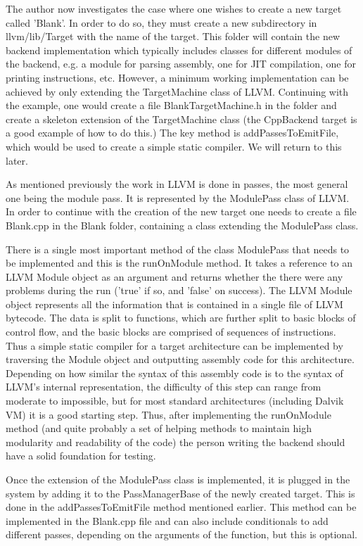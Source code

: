 \documentclass[parskip]{cs4rep}
\begin{document}
The author now investigates the case where one wishes to create a new target called 'Blank'. In order to do so, they must create a new subdirectory in llvm/lib/Target with the name of the target. This folder will contain the new backend implementation which typically includes classes for different modules of the backend, e.g. a module for parsing assembly, one for JIT compilation, one for printing instructions, etc. However, a minimum working implementation can be achieved by only extending the TargetMachine class of LLVM. Continuing with the example, one would create a file BlankTargetMachine.h in the folder and create a skeleton extension of the TargetMachine class (the CppBackend target is a good example of how to do this.) The key method is addPassesToEmitFile, which would be used to create a simple static compiler. We will return to this later.

As mentioned previously the work in LLVM is done in passes, the most general one being the module pass. It is represented by the ModulePass class of LLVM. In order to continue with the creation of the new target one needs to create a file Blank.cpp in the Blank folder, containing a class extending the ModulePass class.

There is a single most important method of the class ModulePass that needs to be implemented and this is the runOnModule method. It takes a reference to an LLVM Module object as an argument and returns whether the there were any problems during the run ('true' if so, and 'false' on success). The LLVM Module object represents all the information that is contained in a single file of LLVM bytecode. The data is split to functions, which are further split to basic blocks of control flow, and the basic blocks are comprised of sequences of instructions. Thus a simple static compiler for a target architecture  can be implemented by traversing the Module object and outputting assembly code for this architecture. Depending on how similar the syntax of this assembly code is to the syntax of LLVM's internal representation, the difficulty of this step can range from moderate to impossible, but for most standard architectures (including Dalvik VM) it is a good starting step. Thus, after implementing the runOnModule method (and quite probably a set of helping methods to maintain high modularity and readability of the code) the person writing the backend should have a solid foundation for testing.

Once the extension of the ModulePass class is implemented, it is plugged in the system by adding it to the PassManagerBase of the newly created target. This is done in the addPassesToEmitFile method mentioned earlier. This method can be implemented in the Blank.cpp file and can also include conditionals to add different passes, depending on the arguments of the function, but this is optional.
\end{document}

